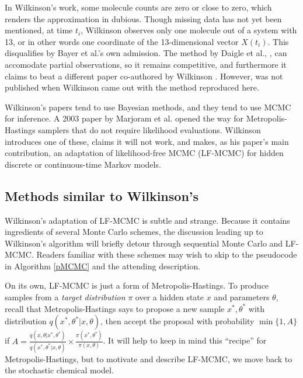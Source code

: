 \documentclass{article}
\begin{document}
In Wilkinson's work, some molecule counts are zero or close to zero, which renders the approximation in \cite{horvath2008parameter} dubious. Though missing data has not yet been mentioned, at time $t_i$, Wilkinson observes only one molecule out of a system with 13, or in other words one coordinate of the 13-dimensional vector $X(t_i)$. This disqualifies \cite{bayer2015stoch_em} by Bayer et al.'s own admission. The method by Daigle et al., \cite{daigle2012accelerated}, can accomodate partial observations, so it remains competitive, and furthermore it claims to beat a different paper co-authored by Wilkinson \cite{Boys2008}. However, \cite{daigle2012accelerated} was not published when Wilkinson came out with the method reproduced here.

Wilkinson's papers tend to use Bayesian methods, and they tend to use MCMC for inference. A 2003 paper by Marjoram et al. \cite{Marjoram23122003} opened the way for Metropolis-Hastings samplers that do not require likelihood evaluations. Wilkinson introduces one of these, claims it will not work, and makes, as his paper's main contribution, an adaptation of likelihood-free MCMC (LF-MCMC) for hidden discrete or continuous-time Markov models.

\subsection{Methods similar to Wilkinson's}
\label{MC_backgr}
Wilkinson's adaptation of LF-MCMC is subtle and strange. Because it contains ingredients of several Monte Carlo schemes, the discussion leading up to Wilkinson's algorithm will briefly detour through sequential Monte Carlo and LF-MCMC. Readers familiar with these schemes may wish to skip to the pseudocode in Algorithm \ref{pMCMC} and the attending description. 

On its own, LF-MCMC is just a form of Metropolis-Hastings. To produce samples from a {\it target distribution} $\pi$ over a hidden state $x$ and parameters $\theta$, recall that Metropolis-Hastings says to propose a new sample $x^*, \theta^*$ with distribution $q(x^*, \theta^*|x, \theta)$, then accept the proposal with probability $\min \{1, A\}$ if $A=\frac{q(x, \theta|x^*, \theta^*)}{q(x^*, \theta^*|x, \theta)} \times \frac{\pi(x^*, \theta^*)}{\pi(x, \theta)}$. It will help to keep in mind this ``recipe'' for Metropolis-Hastings, but to motivate and describe LF-MCMC, we move back to the stochastic chemical model.
\end{document}
